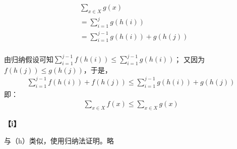 \documentclass{article}
\theoremstyle{mystyle}
\begin{document}
\begin{align*}
       & \sum \limits_{x \in X} g(x)                    \\
       & = \sum \limits_{i = 1}^j g(h(i))               \\
       & = \sum \limits_{i = 1}^{j-1} g(h(i)) + g(h(j)) \\
\end{align*}

由归纳假设可知$\sum \limits_{i = 1}^{j-1} f(h(i)) \leq \sum \limits_{i = 1}^{j-1} g(h(i))$；
又因为$f(h(j)) \leq g(h(j))$，于是，
\begin{align*}
      \sum \limits_{i = 1}^{j-1} f(h(i)) + f(h(j)) \leq \sum \limits_{i = 1}^{j-1} g(h(i)) + g(h(j))
\end{align*}
即：
\begin{align*}
      \sum \limits_{x \in X} f(x) \leq \sum \limits_{x \in X} g(x)
\end{align*}

\textbf{【i】}

与（h）类似，使用归纳法证明。略
\end{document}
